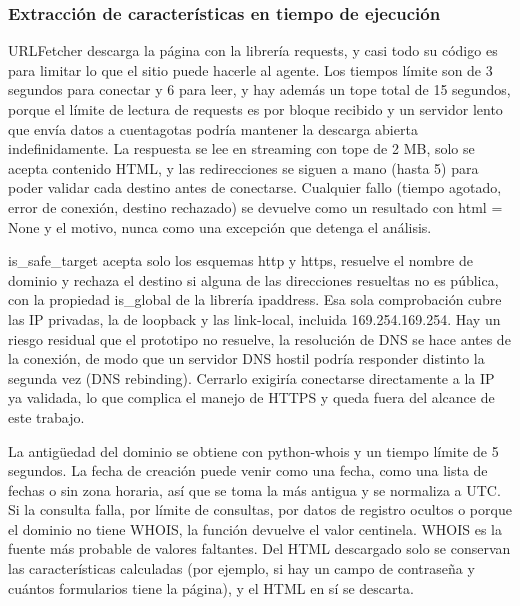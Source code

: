 \subsubsection{Extracción de características en tiempo de ejecución}

URLFetcher descarga la página con la librería requests, y casi todo su código es para limitar lo que el sitio puede hacerle al agente. Los tiempos límite son de 3 segundos para conectar y 6 para leer, y hay además un tope total de 15 segundos, porque el límite de lectura de requests es por bloque recibido y un servidor lento que envía datos a cuentagotas podría mantener la descarga abierta indefinidamente. La respuesta se lee en streaming con tope de 2 MB, solo se acepta contenido HTML, y las redirecciones se siguen a mano (hasta 5) para poder validar cada destino antes de conectarse. Cualquier fallo (tiempo agotado, error de conexión, destino rechazado) se devuelve como un resultado con html = None y el motivo, nunca como una excepción que detenga el análisis. \newline

is\_safe\_target acepta solo los esquemas http y https, resuelve el nombre de dominio y rechaza el destino si alguna de las direcciones resueltas no es pública, con la propiedad is\_global de la librería ipaddress. Esa sola comprobación cubre las IP privadas, la de loopback y las link-local, incluida 169.254.169.254. Hay un riesgo residual que el prototipo no resuelve, la resolución de DNS se hace antes de la conexión, de modo que un servidor DNS hostil podría responder distinto la segunda vez (DNS rebinding). Cerrarlo exigiría conectarse directamente a la IP ya validada, lo que complica el manejo de HTTPS y queda fuera del alcance de este trabajo. \newline

La antigüedad del dominio se obtiene con python-whois y un tiempo límite de 5 segundos. La fecha de creación puede venir como una fecha, como una lista de fechas o sin zona horaria, así que se toma la más antigua y se normaliza a UTC. Si la consulta falla, por límite de consultas, por datos de registro ocultos o porque el dominio no tiene WHOIS, la función devuelve el valor centinela. WHOIS es la fuente más probable de valores faltantes. Del HTML descargado solo se conservan las características calculadas (por ejemplo, si hay un campo de contraseña y cuántos formularios tiene la página), y el HTML en sí se descarta. \newline

